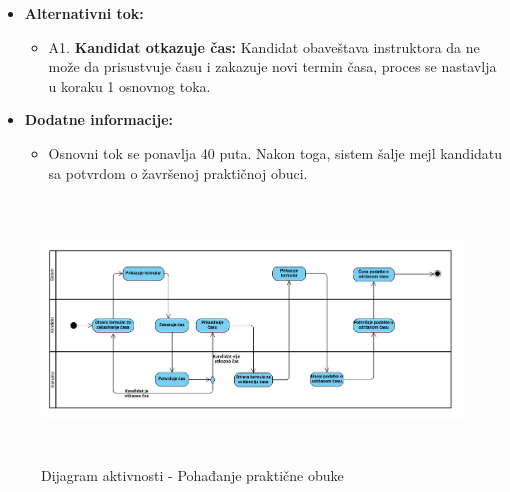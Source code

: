 \begin{itemize}
\item \textbf{Alternativni tok:}  
   \begin{itemize}
   \item A1. \textbf{Kandidat otkazuje čas:}
  Kandidat obaveštava instruktora da ne može da prisustvuje času i zakazuje novi termin časa, proces se nastavlja u koraku 1 osnovnog toka.
   \end{itemize}

\item \textbf{Dodatne informacije:}    
\begin{itemize}
\item Osnovni tok se ponavlja 40 puta. Nakon toga, sistem šalje mejl kandidatu sa potvrdom o žavršenoj praktičnoj obuci.
\end{itemize}

\end{itemize}

\begin{figure}[H]
  \begin{center}
      \includegraphics[width=140mm, height=70mm]{Diagrams/dijagram_aktivnosti_pohadjanje_prakticne_obuke.png}
  \end{center}
  \caption {Dijagram aktivnosti - Pohađanje praktične obuke}
  \label{activity_pohadjanje_prakticne_obuke}

\end{figure}
